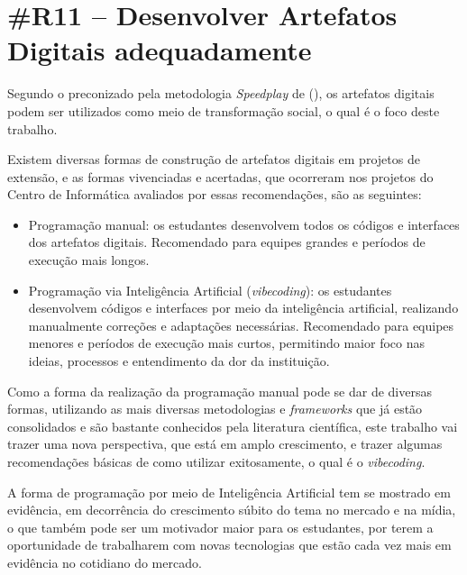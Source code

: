 \section*{\#R11 – Desenvolver Artefatos Digitais adequadamente}

Segundo o preconizado pela metodologia \textit{Speedplay} de \citeauthor{ferrario2014} (\citeyear{ferrario2014}), os artefatos digitais podem ser utilizados como meio de transformação social, o qual é o foco deste trabalho. 

Existem diversas formas de construção de artefatos digitais em projetos de extensão, e as formas vivenciadas e acertadas, que ocorreram nos projetos do Centro de Informática avaliados por essas recomendações, são as seguintes:

\begin{itemize}
    \item Programação manual: os estudantes desenvolvem todos os códigos e interfaces dos artefatos digitais. Recomendado para equipes grandes e períodos de execução mais longos.
    \item Programação via Inteligência Artificial (\textit{vibecoding}): os estudantes desenvolvem códigos e interfaces por meio da inteligência artificial, realizando manualmente correções e adaptações necessárias. Recomendado para equipes menores e períodos de execução mais curtos, permitindo maior foco nas ideias, processos e entendimento da dor da instituição.
\end{itemize}

Como a forma da realização da programação manual pode se dar de diversas formas, utilizando as mais diversas metodologias e \textit{frameworks} que já estão consolidados e são bastante conhecidos pela literatura científica, este trabalho vai trazer uma nova perspectiva, que está em amplo crescimento, e trazer algumas recomendações básicas de como utilizar exitosamente, o qual é o \textit{vibecoding}.

A forma de programação por meio de Inteligência Artificial tem se mostrado em evidência, em decorrência do crescimento súbito do tema no mercado e na mídia, o que também pode ser um motivador maior para os estudantes, por terem a oportunidade de trabalharem com novas tecnologias que estão cada vez mais em evidência no cotidiano do mercado. 

